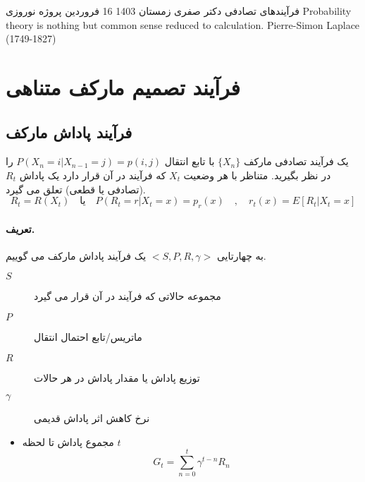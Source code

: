 \documentclass[12pt]{article}
\begin{document}
	\pagestyle{empty}
	\heading
	{
		فرآیندهای تصادفی
	}
	{
		دکتر صفری
	}
	{زمستان 1403}
	{16 فروردین}
	{
		پروژه نوروزی
	}
	\inspiringQuotation
	{Probability theory is nothing but common sense reduced to calculation. }
	{Pierre-Simon Laplace (1749-1827)}
	


    \section{
        فرآیند تصمیم مارکف متناهی
    }   
    \subsection{فرآیند پاداش مارکف}
    یک فرآیند تصادفی مارکف \(\{ X_n \}\) با تابع انتقال \(P(X_n = i | X_{n-1} = j) = p(i,j)\) را در نظر بگیرید. متناظر با هر وضعیت \(X_t\) که فرآیند در آن قرار دارد یک پاداش \(R_t\) (تصادفی یا قطعی) تعلق می گیرد.
    \[R_t = R(X_t) \quad \textrm{یا} \quad P(R_t= r | X_t=x) = p_r(x) \quad , \quad r_t(x) = E[R_t | X_t = x] \]
    \paragraph{تعریف.} به چهارتایی \(<S , P , R , \gamma>\) یک فرآیند پاداش مارکف می گوییم. 
    \begin{description}
        \item[\(S\)] مجموعه حالاتی که فرآیند در آن قرار می گیرد
        \item[\(P\)] ماتریس/تابع احتمال انتقال
        \item[\(R\)] توزیع پاداش یا مقدار پاداش در هر حالات
        \item[\(\gamma\)] نرخ کاهش اثر پاداش قدیمی
    \end{description}
    \begin{itemize}
        \item مجموع پاداش تا لحظه \(t\) \[ G_t = \sum_{n=0}^{t} \gamma^{t - n} R_n\]
    \end{itemize}
\end{document}
